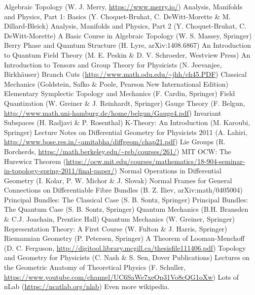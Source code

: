 \documentclass[12pt]{report}
\begin{document}
\begin{thebibliography}{99}
	Algebraic Topology (W. J. Merry, \url{https://www.merry.io/})
	Analysis, Manifolds and Physics, Part 1: Basics (Y. Choquet-Bruhat, C. DeWitt-Morette \& M. Dillard-Bleick)
	Analysis, Manifolds and Physics, Part 2 (Y. Choquet-Bruhat, C. DeWitt-Morette)
	A Basic Course in Algebraic Topology (W. S. Massey, Springer)
	Berry Phase and Quantum Structure (H. Lyre, arXiv:1408.6867)
	An Introduction to Quantum Field Theory (M. E. Peskin \& D. V. Schroeder, Westview Press)
    	An Introduction to Tensors and Group Theory for Physicists (N. Jeevanjee, Birkh\"auser)
    	Branch Cuts (\url{http://www.math.odu.edu/~jhh/ch45.PDF})
	Classical Mechanics (Goldstein, Safko \& Poole, Pearson New International Edition)
	Elementary Symplectic Topology and Mechanics (F. Cardin, Springer)
	Field Quantization (W. Greiner \& J. Reinhardt, Springer)
	Gauge Theory (F. Belgun, \url{http://www.math.uni-hamburg.de/home/belgun/Gauge4.pdf})
	Invariant Subspaces (H. Radjavi \& P. Rosenthal)
	K-Theory: An Introduction (M. Karoubi, Springer)
	Lecture Notes on Differential Geometry for Physicists 2011 (A. Lahiri, \url{http://www.bose.res.in/~amitabha/diffgeom/chap21.pdf})
	Lie Groups (R. Borcherds, \url{https://math.berkeley.edu/~reb/courses/261/})
	MIT OCW: The Hurewicz Theorem (\url{https://ocw.mit.edu/courses/mathematics/18-904-seminar-in-topology-spring-2011/final-paper/})
	Normal Operations in Differential Geometry (I. Kolar, P. W. Michor \& J. Slovak)
	Normal Frames for General Connections on Differentiable Fibre Bundles (B. Z. Iliev, arXiv:math/0405004)
	Principal Bundles: The Classical Case (S. B. Sontz, Springer)
	Principal Bundles: The Quantum Case (S. B. Sontz, Springer)
    	Quantum Mechanics (B.H. Bransden \& C.J. Joachain, Prentice Hall)
    	Quantum Mechanics (W. Greiner, Springer)
	Representation Theory: A First Course (W. Fulton \& J. Harris, Springer)
	Riemannian Geometry (P. Petersen, Springer)
	A Theorem of Looman-Menchoff (D. C. Ferguson, \url{http://digitool.library.mcgill.ca/thesisfile111406.pdf})
	Topology and Geometry for Physicists (C. Nash \& S. Sen, Dover Publications)
	Lectures on the Geometric Anatomy of Theoretical Physics (F. Schuller, \url{https://www.youtube.com/channel/UC6SaWe7xeOp31Vo8cQG1oXw})
	Lots of nLab (\url{https://ncatlab.org/nlab})
	Even more wikipedia.
\end{thebibliography}
\printindex
\end{document}
